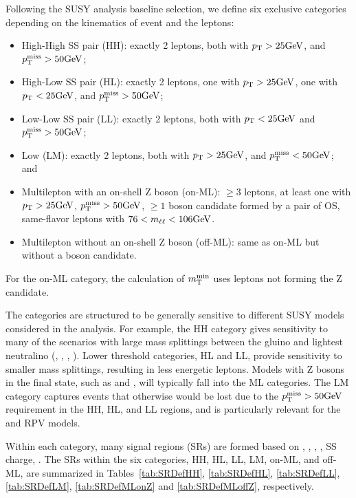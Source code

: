 Following the SUSY analysis baseline selection, we define 
six exclusive categories depending on the kinematics of event and the leptons:
\begin{itemize}
\item High-High SS pair (HH): exactly 2 leptons, both with $p_{\mathrm{T}}>25 \text{GeV}$, and $p_{\mathrm{T}}^\text{miss}>50 \text{GeV}$;
\item High-Low SS pair (HL): exactly 2 leptons, one with $p_{\mathrm{T}}>25 \text{GeV}$, one with $p_{\mathrm{T}}<25 \text{GeV}$, and $p_{\mathrm{T}}^\text{miss}>50 \text{GeV}$;
\item Low-Low SS pair (LL): exactly 2 leptons, both with $p_{\mathrm{T}}<25 \text{GeV}$ and $p_{\mathrm{T}}^\text{miss}>50 \text{GeV}$;
\item Low \ptmiss (LM): exactly 2 leptons, both with $p_{\mathrm{T}}>25 \text{GeV}$, and $p_{\mathrm{T}}^\text{miss}<50 \text{GeV}$; and
\item Multilepton with an on-shell Z boson (on-\PZ ML): $\geq$3 leptons, at least one with $p_{\mathrm{T}}>25 \text{GeV}$, $p_{\mathrm{T}}^\text{miss}>50 \text{GeV}$, $\geq 1$ \PZ boson candidate formed by a pair of OS, same-flavor leptons with $76 < m_{\ell\ell}< 106 \text{GeV}$.
\item Multilepton without an on-shell Z boson (off-\PZ ML): same as on-\PZ ML but without a \PZ boson candidate.
\end{itemize}

For the on-\PZ ML category, the calculation of $m_{\mathrm{T}}^{\text{min}}$ uses leptons not 
forming the Z candidate.

The categories are structured to be generally sensitive to different SUSY models
considered in the analysis. For example, the HH category gives sensitivity
to many of the scenarios with large mass splittings between the 
gluino and lightest neutralino (\Totttt, \TfttbbWW, \Tftttt, \TfqqqqWW).
Lower \pt threshold categories, HL and LL, provide sensitivity to smaller 
mass splittings, resulting in less energetic leptons. Models with
Z bosons in the final state, such as \TfqqqqWZ and \TsttHZ, will typically
fall into the ML categories. The LM category captures events that
otherwise would be lost due to the $p_{\mathrm{T}}^\text{miss}>50\text{GeV}$ requirement in the
HH, HL, and LL regions, and is particularly relevant for the 
\ToqqqqL and \Totbs RPV models.


Within each category, many signal regions (SRs) are formed based on 
\Njets, \Nbjets, \HT, \ptmiss, SS charge, \mtmin.
The SRs
within the six categories, HH, HL, LL, LM, on-\PZ ML, and off-\PZ ML,
are summarized in Tables~\ref{tab:SRDefHH}, \ref{tab:SRDefHL},
\ref{tab:SRDefLL}, \ref{tab:SRDefLM}, \ref{tab:SRDefMLonZ} and
\ref{tab:SRDefMLoffZ}, respectively. 

